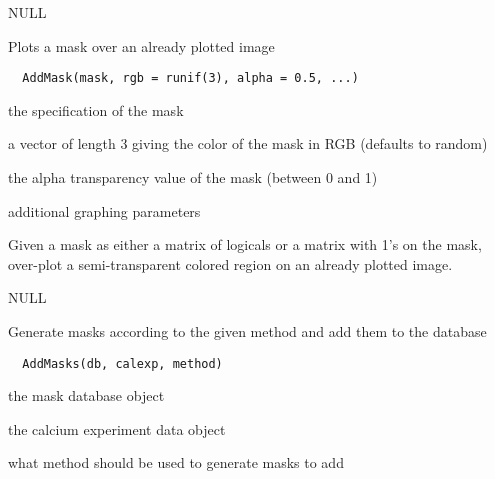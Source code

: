 \documentclass[a4paper]{book}
\begin{document}
%
\begin{Value}
NULL
\end{Value}
%
\begin{Description}\relax
Plots a mask over an already plotted image
\end{Description}
%
\begin{Usage}
\begin{verbatim}
  AddMask(mask, rgb = runif(3), alpha = 0.5, ...)
\end{verbatim}
\end{Usage}
%
\begin{Arguments}
\begin{ldescription}
\item[\code{mask}] the specification of the mask

\item[\code{rgb}] a vector of length 3 giving the color of the
mask in RGB (defaults to random)

\item[\code{alpha}] the alpha transparency value of the mask
(between 0 and 1)

\item[\code{...}] additional graphing parameters
\end{ldescription}
\end{Arguments}
%
\begin{Details}\relax
Given a mask as either a matrix of logicals or a matrix
with 1's on the mask, over-plot a semi-transparent
colored region on an already plotted image.
\end{Details}
%
\begin{Value}
NULL
\end{Value}
%
\begin{Description}\relax
Generate masks according to the given method and add them
to the database
\end{Description}
%
\begin{Usage}
\begin{verbatim}
  AddMasks(db, calexp, method)
\end{verbatim}
\end{Usage}
%
\begin{Arguments}
\begin{ldescription}
\item[\code{db}] the mask database object

\item[\code{calexp}] the calcium experiment data object

\item[\code{method}] what method should be used to generate
masks to add
\end{ldescription}
\end{Arguments}
\end{document}
